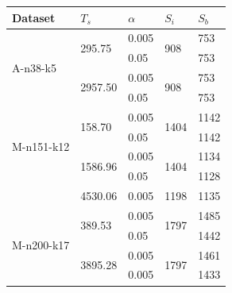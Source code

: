 \begin{table}[h!]
    \centering
    \begin{threeparttable}
    \footnotesize
        \begin{tabularx}{0.45\textwidth}{ X X X X X }
            \toprule
            \textbf{Dataset} & $T_s$ & $\alpha$ & $S_i$ & $S_b$ \\ [0.5ex]
            \midrule
            \multirow{4}{*}{A-n38-k5}   & \multirow{2}{*}{295.75}   & 0.005 & \multirow{2}{*}{908}\tnote{1}  & 753   \\ [0.5ex]
                                        &                           & 0.05  &                       & 753   \\ [0.5ex]
            \cmidrule{2-5}
                                        & \multirow{2}{*}{2957.50}  & 0.005 & \multirow{2}{*}{908}\tnote{1}  & 753   \\ [0.5ex]
                                        &                           & 0.05  &                       & 753   \\ [0.5ex]
            \midrule
            \multirow{4}{*}{M-n151-k12} & \multirow{2}{*}{158.70}   & 0.005 & \multirow{2}{*}{1404}\tnote{1} & 1142  \\ [0.5ex]
                                        &                           & 0.05  &                       & 1142  \\ [0.5ex]
            \cmidrule{2-5}
                                        & \multirow{2}{*}{1586.96}  & 0.005 & \multirow{2}{*}{1404}\tnote{1} & 1134  \\ [0.5ex]
                                        &                           & 0.05  &                       & 1128  \\ [0.5ex]
            \cmidrule{2-5}
                                        & 4530.06                   & 0.005 & 1198\tnote{2}                  & 1135  \\ [0.5ex]
            \midrule
            \multirow{4}{*}{M-n200-k17} & \multirow{2}{*}{389.53}   & 0.005 & \multirow{2}{*}{1797}\tnote{1} & 1485  \\ [0.5ex]
                                        &                           & 0.05  &                       & 1442  \\ [0.5ex]
            \cmidrule{2-5}
                                        & \multirow{4}{*}{3895.28}  & 0.005 & \multirow{4}{*}{1797}\tnote{1} & 1461  \\ [0.5ex]
                                        &                           & 0.005 &                       & 1433\tnote{3}  \\ [0.5ex] %

\end{tabularx}
\end{threeparttable}
\end{table}
